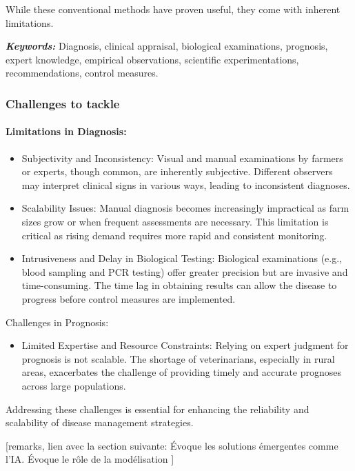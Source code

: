 While these conventional methods have proven useful, they come with inherent limitations.

\textit{\textbf{Keywords:}} Diagnosis, clinical appraisal, biological examinations, prognosis, expert knowledge, empirical observations, scientific experimentations, recommendations, control measures.


\subsubsection{Challenges to tackle}

\paragraph{Limitations in Diagnosis:} 
\begin{itemize}
    \item Subjectivity and Inconsistency: Visual and manual examinations by farmers or experts, though common, are inherently subjective. Different observers may interpret clinical signs in various ways, leading to inconsistent diagnoses.
    \item Scalability Issues: Manual diagnosis becomes increasingly impractical as farm sizes grow or when frequent assessments are necessary. This limitation is critical as rising demand requires more rapid and consistent monitoring.
    \item Intrusiveness and Delay in Biological Testing: Biological examinations (e.g., blood sampling and PCR testing) offer greater precision but are invasive and time-consuming. The time lag in obtaining results can allow the disease to progress before control measures are implemented.
\end{itemize}

Challenges in Prognosis:
\begin{itemize}
    \item Limited Expertise and Resource Constraints: Relying on expert judgment for prognosis is not scalable. The shortage of veterinarians, especially in rural areas, exacerbates the challenge of providing timely and accurate prognoses across large populations.
\end{itemize}

Addressing these challenges is essential for enhancing the reliability and scalability of disease management strategies. 


[remarks, lien avec la section suivante: Évoque les solutions émergentes comme l'IA. Évoque le rôle de la modélisation ]


